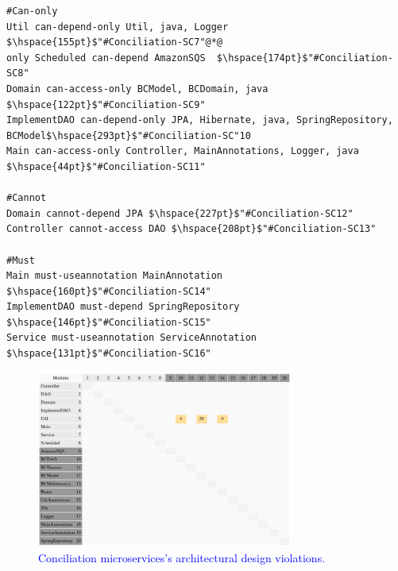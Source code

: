 \documentclass[12pt]{article}
\begin{document}
\begin{lstlisting}[style=colorido, caption={\textcolor{blue}{Conciliation microservice's architectural design specification.}},label={list:especArquiteturalConciliation}
]
#Can-only
Util can-depend-only Util, java, Logger $\hspace{155pt}$"#Conciliation-SC7"@*@
only Scheduled can-depend AmazonSQS	 $\hspace{174pt}$"#Conciliation-SC8"
Domain can-access-only BCModel, BCDomain, java $\hspace{122pt}$"#Conciliation-SC9"
ImplementDAO can-depend-only JPA, Hibernate, java, SpringRepository, BCModel$\hspace{293pt}$"#Conciliation-SC"10
Main can-access-only Controller, MainAnnotations, Logger, java $\hspace{44pt}$"#Conciliation-SC11"

#Cannot
Domain cannot-depend JPA $\hspace{227pt}$"#Conciliation-SC12"
Controller cannot-access DAO $\hspace{208pt}$"#Conciliation-SC13"

#Must
Main must-useannotation MainAnnotation	$\hspace{160pt}$"#Conciliation-SC14"
ImplementDAO must-depend SpringRepository $\hspace{146pt}$"#Conciliation-SC15"
Service must-useannotation ServiceAnnotation $\hspace{131pt}$"#Conciliation-SC16"
\end{lstlisting}
\begin{figure}[ht]
\centering
\includegraphics[width=0.75\textwidth]{figuras/violacoesConciliation.png}
\caption{\textcolor{blue}{Conciliation microservices's architectural design violations.}}
\label{fig:microservices}
\end{figure}
\end{document}

